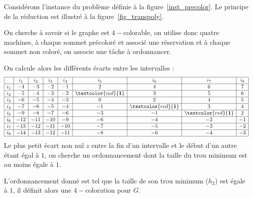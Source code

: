 \begin{ex}
    Considérons l'instance du problème \precolor{} définie à la figure~\ref{inst_precolor}.
    Le principe de la réduction est illustré à la figure~\ref{fig_transpoly}.

    On cherche à savoir si le graphe est $4-$colorable, on utilise donc quatre machines, à chaque
    sommet précoloré et associé une réservation et à chaque sommet non coloré, on associe une tâche
    à ordonnancer. 
    
    On calcule alors les différents écarts entre les intervalles : \[
        \begin{array}{|c|c|c|c|c|c|c|c|c|}
            \hline & i_1 & i_2 & i_3 & i_4 & i_5 & i_6 & i_7 & i_8 \\
            \hline i_1 & -4 & -3 & -2 & -1 & 2 & 4 & 6 & 7 \\
            \hline i_2 & -5 & -4 & -3 & -2 & \textcolor{red}{\textbf{1}} & 3 & 5 & 6 \\
            \hline i_3 & -6 & -5 & -4 & -3 & 0 & 2 & 4 & 5 \\
            \hline i_4 & -7 & -6 & -5 & -4 & -1 & \textcolor{red}{\textbf{1}} & 3 & 4 \\
            \hline i_5 & -9 & -8 & -7 & -6 & -3 & -1 & \textcolor{red}{\textbf{1}} & 2 \\
            \hline i_6 & -12 & -11 & -10 & -9 & -6 & -4 & -2 & -1 \\
            \hline i_7 & -13 & -12 & -11 & -10 & -7 & -5 & -3 & -2 \\
            \hline i_8 & -14 & -13 & -12 & -11 & -8 & -6 & -4 & -3 \\
            \hline
        \end{array}
    \]
    Le plus petit écart non nul $z$ entre la fin d'un intervalle et le début d'un
    autre étant égal à $1$, on cherche un ordonnancement dont la taille du trou minimum est au moins
    égale à $1$.

    L'ordonnancement donné est tel que la taille de son trou minimum ($h_2$) est égale à $1$, il
    définit alors une $4-$coloration pour $G$.
    
\begin{figure}
    \begin{center}
\end{center}
\end{figure}
\end{ex}
